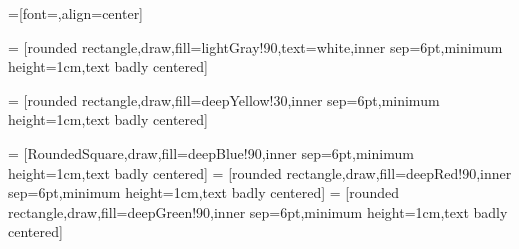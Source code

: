 \usetikzlibrary{backgrounds}





=[font=\sffamily,align=center]

\newcommand{\fillOpacity}{90}
\newcommand{\fillOpacityTwo}{30}
\newcommand{\fillOpacityThree}{10}

\newcommand{\compShape}{rectangle}
\newcommand{\groupShape}{RoundedSquare}
\newcommand{\funcShape}{chamfered rectangle}
\newcommand{\procShape}{rounded rectangle}

\newcommand{\explicitColor}{deepGreen}
\newcommand{\customColor}{deepYellow}
\newcommand{\implicitColor}{deepCyan}
\newcommand{\optimizationColor}{lightGray}
\newcommand{\fluidColor}{deepBlue}
\newcommand{\solidColor}{deepRed}
\newcommand{\propulsionColor}{deepYellow}
\newcommand{\FuncFluidColor}{deepBlue}
\newcommand{\FuncSolidColor}{deepRed}

 = [\procShape,draw,fill=\optimizationColor!\fillOpacity,text=white,inner sep=6pt,minimum height=1cm,text badly centered]

 = [\procShape,draw,fill=deepYellow!\fillOpacityTwo,inner sep=6pt,minimum height=1cm,text badly centered]

 = [\groupShape,draw,fill=deepBlue!\fillOpacity,inner sep=6pt,minimum height=1cm,text badly centered]
 = [\procShape,draw,fill=deepRed!\fillOpacity,inner sep=6pt,minimum height=1cm,text badly centered]
 = [\procShape,draw,fill=deepGreen!\fillOpacity,inner sep=6pt,minimum height=1cm,text badly centered]

